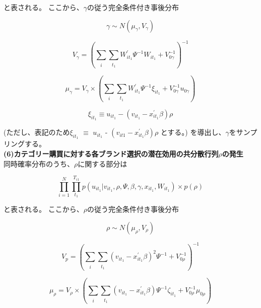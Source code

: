 \documentclass[11pt]{jsarticle}
\begin{document}
と表される。
ここから、$\gamma$の従う完全条件付き事後分布

\begin{equation} \label{formula46}
\gamma \sim N(\mu_{\gamma}, V_{\gamma})
\end{equation}

\begin{equation} \label{formula47}
V_{\gamma} = 
\left(
\sum_{\substack{i}} \sum_{\substack{t_{1}}} W^{\prime}_{it_{1}} \Psi^{-1} W_{it_{1}} + V^{-1}_{0\gamma}
\right)^{-1}
\end{equation}

\begin{equation} \label{formula48}
\mu_{\gamma} = V_{\gamma} \times
\left(
\sum_{\substack{i}} \sum_{\substack{t_{1}}} W^{\prime}_{it_{1}} \Psi^{-1} \xi_{it_{1}} + V^{-1}_{0\gamma} u_{0\gamma}
\right)
\end{equation}

\begin{equation} \label{formula48-1}
\xi_{it_{1}} \equiv u_{it_{1}} - (v_{it_{1}} - x^{\prime}_{it_{1}} \beta) \rho
\end{equation}

(ただし、表記のため$\xi_{it_{1}}$ $\equiv$ $u_{it_{1}}$ - $(v_{it{1}} - x^{\prime}_{it_{1}}\beta)\rho$ とする。)
を導出し、$\gamma$をサンプリングする。\\[1ex] 

{\bf (6)カテゴリー購買に対する各ブランド選択の潜在効用の共分散行列$\rho$の発生}\\
同時確率分布のうち、$\rho$に関する部分は

\begin{equation} \label{formula49}
\prod_{i=1}^{N} \prod_{t_{1}}^{T_{i1}} p(u_{it_{1}} | v_{it_{1}}, \rho, \Psi, \beta, \gamma, x_{it_{1}}, W_{it_{1}}) \times p(\rho)
\end{equation}

と表される。
ここから、$\rho$の従う完全条件付き事後分布

\begin{equation} \label{formula50}
\rho \sim N(\mu_{\rho}, V_{\rho})
\end{equation}

\begin{equation} \label{formula51}
V_{p} = 
\left(
\sum_{\substack{i}} \sum_{\substack{t_{1}}} (v_{it_{1}} - x^{\prime}_{it_{1}} \beta)^2 \Psi^{-1} + V^{-1}_{0\rho}
\right)^{-1}
\end{equation}

\begin{equation} \label{formula52}
\mu_{\rho} = V_{\rho} \times 
\left(
\sum_{\substack{i}} \sum_{\substack{t_{1}}} (v_{it_{1}} - x^{\prime}_{it_{1}} \beta) \Psi^{-1} \zeta_{it_{1}} + V^{-1}_{0\rho} \mu_{0\rho}
\right)
\end{equation}
\end{document}
